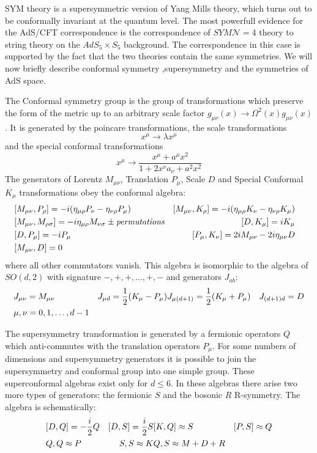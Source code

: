 \documentclass[11pt,a4paper]{article}
\begin{document}
SYM theory is a supersymmetric version of Yang Mills theory, which turns out to be conformally invariant at the quantum level. The most powerfull evidence for the AdS/CFT correspondence is the correspondence of $SYM\mathcal{N}=4$ theory to string theory on the $AdS_5\times S_5$ background. The correspondence in this case is supported by the fact that the two theories contain the same symmetries. We will now briefly describe conformal symmetry ,supersymmetry and the symmetries of AdS space.

The Conformal symmetry group is the group of transformations which preserve the form of the metric up to an arbitrary scale factor $g_{\mu\nu}\left(x\right)\rightarrow\Omega^2\left(x\right)g_{\mu\nu}\left(x\right)$. It is generated by the poincare transformations, the scale transformations
\begin{equation}
x^\mu\rightarrow\lambda x^\mu
\end{equation}
and the special conformal transformations
\begin{equation}
x^\mu\rightarrow\frac{x^\mu+a^\mu x^2}{1+2x^\nu a_\nu+a^2x^2} 
\end{equation}
The generators of Lorentz $M_{\mu\nu}$, Translation $P_\mu$, Scale $D$ and Special Conformal $K_\mu$ transformations obey the conformal algebra:
\begin{align}
&[M_{\mu\nu},P_\rho]=-i(\eta_{\mu\rho}P_\nu-\eta_{\nu\rho}P_\mu) &[M_{\mu\nu},K_\rho]=-i(\eta_{\mu\rho}K_\nu-\eta_{\nu\rho}K_\mu) \notag \\
&[M_{\mu\nu},M_{\rho\sigma}]=-i\eta_{\mu\rho}M_{\nu\sigma}\pm\textit{permutations} &[D,K_\mu]=iK_\mu \notag \\
&[D,P_\mu]=-iP_\mu &[P_\mu,K_\nu]=2iM_{\mu\nu}-2i\eta_{\mu\nu}D & \notag \\
&[M_{\mu\nu},D]=0
\end{align}
where all other commutators vanish. This algebra is isomorphic to the algebra of $SO(d,2)$ with signature $-,+,+,\hdots,+,-$ and generators $J_{ab}$:
\begin{align}
&J_{\mu\nu}=M_{\mu\nu} &J_{\mu d}=\frac{1}{2}(K_\mu-P_\mu) &J_{\mu(d+1)}=\frac{1}{2}(K_\mu+P_\mu) &J_{(d+1)d}=D \\
&\mu,\nu=0,1,\hdots,d-1 \notag
\end{align}

The supersymmetry transformation is generated by a fermionic operators $Q$ which anti-commutes with the translation operators $P_\mu$. For some numbers of dimensions and supersymmetry generators it is possible to join the supersymmetry and conformal group into one simple group. These superconformal algebras exist only for $d\leq 6$. In these algebras there arise two more types of generators: the fermionic $S$ and the bosonic $R$ R-symmetry. The algebra is schematically:
\begin{align}
&[D,Q]=-\frac{i}{2}Q & [D,S]=\frac{i}{2}S &[K,Q]\approx S &[P,S]\approx Q \notag \\
&{Q,Q}\approx P &{S,S}\approx K &{Q,S}\approx M+D+R
\end{align}
\end{document}
